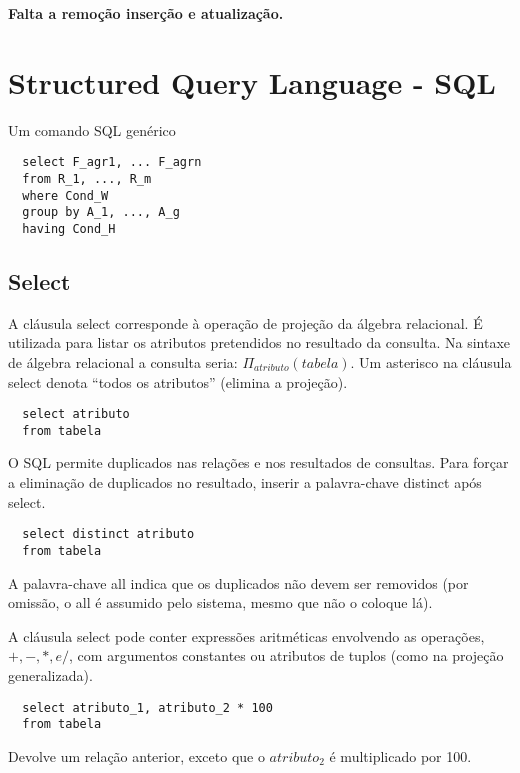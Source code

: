 \documentclass{article}
\begin{document}
\textbf{Falta a remoção inserção e atualização.}

\section{Structured Query Language - SQL}
Um comando SQL genérico
\begin{lstlisting}
  select F_agr1, ... F_agrn
  from R_1, ..., R_m
  where Cond_W
  group by A_1, ..., A_g
  having Cond_H
\end{lstlisting}


\subsection{Select}
A cláusula select corresponde à operação de projeção da álgebra relacional. É utilizada para listar os atributos pretendidos no resultado da consulta. Na sintaxe de álgebra relacional a consulta seria: $\Pi_{atributo}(tabela)$. Um asterisco na cláusula select denota “todos os atributos” (elimina a projeção).
\begin{lstlisting}
  select atributo
  from tabela
\end{lstlisting}
O SQL permite duplicados nas relações e nos resultados de consultas. Para forçar a eliminação de duplicados no resultado, inserir a palavra-chave distinct após select.
\begin{lstlisting}
  select distinct atributo
  from tabela
\end{lstlisting}
A palavra-chave all indica que os duplicados não devem ser removidos (por omissão, o all é assumido pelo sistema, mesmo que não o coloque lá).

A cláusula select pode conter expressões aritméticas envolvendo as operações, $+, -, *, e /$, com argumentos constantes ou atributos de tuplos (como na projeção generalizada).
\begin{lstlisting}
  select atributo_1, atributo_2 * 100
  from tabela
\end{lstlisting}
Devolve um relação anterior, exceto que o $atributo_2$ é multiplicado por 100.
\end{document}
